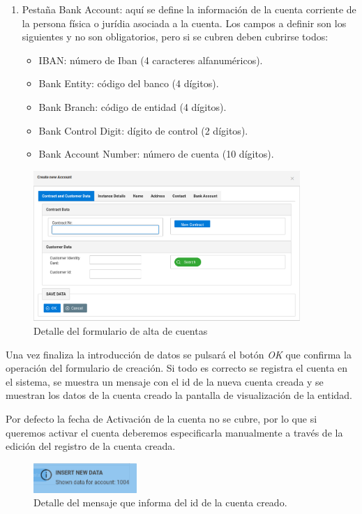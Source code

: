 \begin{description}
\begin{enumerate}
\item Pestaña Bank Account: aquí se define la información de la cuenta corriente de la persona física o jurídia asociada a la cuenta. Los campos a definir son los siguientes y no son obligatorios, pero si se cubren deben cubrirse todos:
	\begin{itemize}
	\item IBAN: número de Iban (4 caracteres alfanuméricos).
	\item Bank Entity: código del banco (4 dígitos).
	\item Bank Branch: código de entidad (4 dígitos).
	\item Bank Control Digit: dígito de control (2 dígitos).
	\item Bank Account Number: número de cuenta (10 dígitos).	
	\end{itemize}	
\end{enumerate}


\begin{figure}[H]
  \centering
  \includegraphics[width=0.9\textwidth]{imaxes/formulario-alta-cuenta.png}
  \caption{Detalle del formulario de alta de cuentas}
  \label{fig:formulario-alta-cuenta}
\end{figure}

Una vez finaliza la introducción de datos se pulsará el botón \emph{OK} que confirma la operación del formulario de creación. Si todo es correcto se registra el cuenta en el sistema, se muestra un mensaje con el id de la nueva cuenta creada y se muestran los datos de la cuenta creado la pantalla de visualización de la entidad.

Por defecto la fecha de Activación de la cuenta no se cubre, por lo que si queremos activar el cuenta deberemos especificarla manualmente a través de la edición del registro de la cuenta creada.


\begin{figure}[H]
  \centering
  \includegraphics[width=0.35\textwidth]{imaxes/mensaje-id-cuenta.png}
  \caption{Detalle del mensaje que informa del id de la cuenta creado.}
  \label{fig:mensaje-id-cuenta}
\end{figure}



\end{description}
